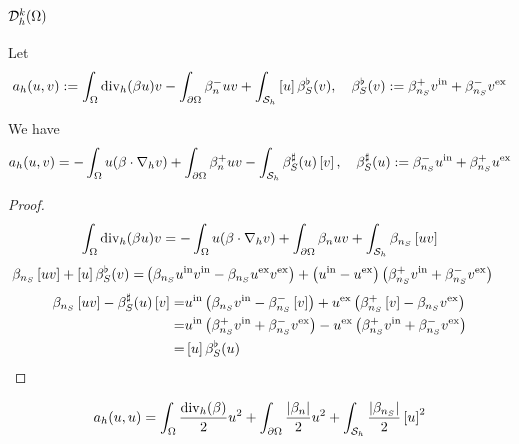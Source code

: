 \subsection{$\mathcal{D}^k_h(\Omega)$}\label{subsec:}
%
Let
%
\begin{equation}\label{eq:}
a_h(u,v) := \int_{\Omega}\operatorname{div}_h(\beta u) v - \int_{\partial\Omega} \beta_n^- uv+ \int_{\mathcal S_h}\left[u\right]\beta_S^{\flat}(v),
\quad \beta_S^{\flat}(v) := \beta_{n_S}^{+}v^{\rm in} + \beta_{n_S}^{-}v^{\rm ex}
\end{equation}
%
\begin{lemma}\label{lemma:}
We have
%
\begin{equation}\label{eq:}
a_h(u,v) = - \int_{\Omega}u (\beta\cdot\nabla_h v) + \int_{\partial\Omega} \beta_n^+ uv  - \int_{\mathcal S_h}\beta_S^{\sharp}(u) \left[v\right],
\quad \beta_S^{\sharp}(u) := \beta_{n_S}^{-}u^{\rm in} + \beta_{n_S}^{+}u^{\rm ex}\end{equation}
%
\end{lemma}
%
\begin{proof}
%
\begin{align*}
\int_{\Omega}\operatorname{div}_h(\beta u) v = - \int_{\Omega}u (\beta\cdot\nabla_h v) + \int_{\partial\Omega} \beta_n uv + \int_{\mathcal S_h}\beta_{n_S} \left[uv\right]
\end{align*}
%
%
\begin{align*}
\beta_{n_S} \left[uv\right] + \left[u\right] \beta_S^{\flat}(v)
=&  \left(\beta_{n_S}u^{\rm in} v^{\rm in}-\beta_{n_S}u^{\rm ex}v^{\rm ex} \right) + \left(u^{\rm in} -u^{\rm ex}\right)\left(\beta_{n_S}^{+}v^{\rm in} + \beta_{n_S}^{-}v^{\rm ex}\right)
\end{align*}
%
%
\begin{align*}
\beta_{n_S} \left[uv\right] - \beta_S^{\sharp}(u) \left[v\right]
=&  u^{\rm in}\left(\beta_{n_S} v^{\rm in}-\beta_{n_S}^{-}\left[v\right] \right) + u^{\rm ex}\left(\beta_{n_S}^{+}\left[v\right]-\beta_{n_S}v^{\rm ex}\right)\\
=& u^{\rm in}\left(\beta_{n_S}^+ v^{\rm in}+\beta_{n_S}^{-}v^{\rm ex} \right) - u^{\rm ex}\left(\beta_{n_S}^+ v^{\rm in}+\beta_{n_S}^{-}v^{\rm ex} \right)\\
=& \left[u\right] \beta_S^{\flat}(u)
\end{align*}
%
\end{proof}
%
\begin{corollary}\label{cor:}
%
\begin{equation}\label{eq:}
a_h(u,u) = \int_{\Omega}\frac{\operatorname{div}_h(\beta)}{2} u^2 + \int_{\partial\Omega} \frac{\left|\beta_n\right|}{2} u^2+ \int_{\mathcal S_h}\frac{\left|\beta_{n_S}\right|}{2}\left[u\right]^2
\end{equation}
%
\end{corollary}
